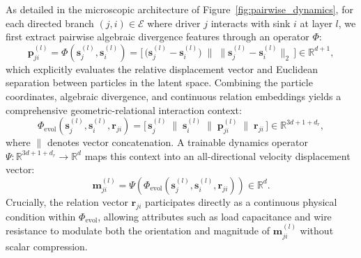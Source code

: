 As detailed in the microscopic architecture of Figure~\ref{fig:pairwise_dynamics}, for each directed branch $(j, i) \in \mathcal{E}$ where driver $j$ interacts with sink $i$ at layer $l$, we first extract pairwise algebraic divergence features through an operator $\Phi$:
\begin{equation}
    \mathbf{p}_{ji}^{(l)} = \Phi\left(\mathbf{s}_j^{(l)}, \mathbf{s}_i^{(l)}\right) = \Big[\, \big(\mathbf{s}_j^{(l)} - \mathbf{s}_i^{(l)}\big) \;\|\; \big\|\mathbf{s}_j^{(l)} - \mathbf{s}_i^{(l)}\big\|_2 \,\Big] \in \mathbb{R}^{d + 1},
    \label{eq:algebraic_operator}
\end{equation}
which explicitly evaluates the relative displacement vector and Euclidean separation between particles in the latent space. Combining the particle coordinates, algebraic divergence, and continuous relation embeddings yields a comprehensive geometric-relational interaction context:
\begin{equation}
    \Phi_{\text{evol}}\!\left(\mathbf{s}_j^{(l)}, \mathbf{s}_i^{(l)}, \mathbf{r}_{ji}\right) = \Big[\, \mathbf{s}_j^{(l)} \;\|\; \mathbf{s}_i^{(l)} \;\|\; \mathbf{p}_{ji}^{(l)} \;\|\; \mathbf{r}_{ji} \,\Big] \in \mathbb{R}^{3d + 1 + d_r},
    \label{eq:pairwise_basis}
\end{equation}
where $\|$ denotes vector concatenation. A trainable dynamics operator $\Psi: \mathbb{R}^{3d + 1 + d_r} \to \mathbb{R}^d$ maps this context into an all-directional velocity displacement vector:
\begin{equation}
    \mathbf{m}_{ji}^{(l)} = \Psi\!\left(\Phi_{\text{evol}}\!\left(\mathbf{s}_j^{(l)}, \mathbf{s}_i^{(l)}, \mathbf{r}_{ji}\right)\right) \in \mathbb{R}^d.
    \label{eq:pairwise_interaction}
\end{equation}
Crucially, the relation vector $\mathbf{r}_{ji}$ participates directly as a continuous physical condition within $\Phi_{\text{evol}}$, allowing attributes such as load capacitance and wire resistance to modulate both the orientation and magnitude of $\mathbf{m}_{ji}^{(l)}$ without scalar compression.

